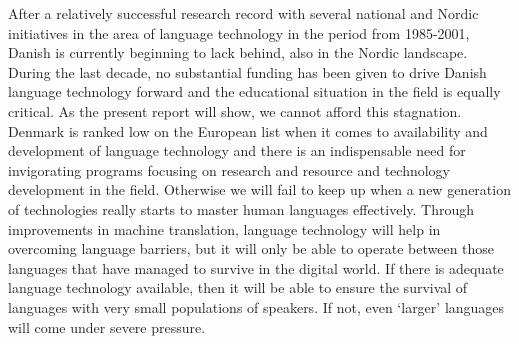 \begin{multicols}{2}
After a relatively successful research record with several national
and Nordic initiatives in the area of language technology in the
period from 1985-2001, Danish is currently beginning to lack behind,
also in the Nordic landscape. During the last decade, no substantial
funding has been given to drive Danish language technology forward and
the educational situation in the field is equally critical. As the
present report will show, we cannot afford this stagnation. Denmark is
ranked low on the European list when it comes to availability and
development of language technology and there is an indispensable need
for invigorating programs focusing on research and resource and
technology development in the field. Otherwise we will fail to keep up
when a new generation of technologies really starts to master human
languages effectively. Through improvements in machine translation,
language technology will help in overcoming language barriers, but it
will only be able to operate between those languages that have managed
to survive in the digital world. If there is adequate language
technology available, then it will be able to ensure the survival of
languages with very small populations of speakers. If not, even
`larger' languages will come under severe pressure.



\end{multicols}

\clearpage


